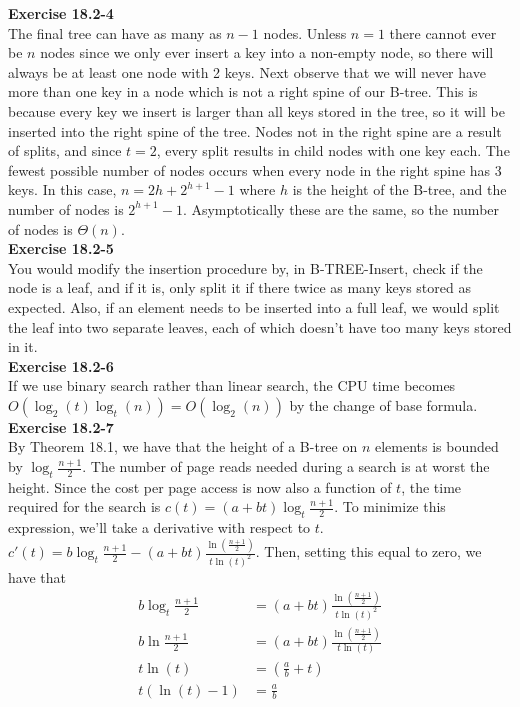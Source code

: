 \documentclass{article}
\begin{document}
\noindent\textbf{Exercise 18.2-4}\\

The final tree can have as many as $n-1$ nodes. Unless $n=1$ there cannot ever be $n$ nodes since we only ever insert a key into a non-empty node, so there will always be at least one node with 2 keys.  Next observe that we will never have more than one key in a node which is not a right spine of our B-tree.  This is because every key we insert is larger than all keys stored in the tree, so it will be inserted into the right spine of the tree.  Nodes not in the right spine are a result of splits, and since $t=2$, every split results in child nodes with one key each. The fewest possible number of nodes occurs when every node in the right spine has 3 keys.  In this case, $n=2h + 2^{h+1}-1$ where $h$ is the height of the B-tree, and the number of nodes is $2^{h+1}-1$.  Asymptotically these are the same, so the number of nodes is $\Theta(n)$.\\

\noindent\textbf{Exercise 18.2-5}\\

You would modify the insertion procedure by, in B-TREE-Insert, check if the node is a leaf, and if it is, only split it if there twice as many keys stored as expected. Also, if an element needs to be inserted into a full leaf, we would split the leaf into two separate leaves, each of which doesn't have too many keys stored in it.\\

\noindent\textbf{Exercise 18.2-6}\\

If we use binary search rather than linear search, the CPU time becomes $O(\log_2(t)\log_t(n)) = O(\log_2(n))$ by the change of base formula.\\

\noindent\textbf{Exercise 18.2-7}\\

By Theorem 18.1, we have that the height  of a B-tree on $n$ elements is bounded by $\log_t \frac{n+1}{2}$. The number of page reads needed during a search is at worst the height. Since the cost per page access is now also a function of $t$, the time required for the search is $c(t) = (a+bt)\log_t \frac{n+1}{2}$. To minimize this expression, we'll take a derivative with respect to $t$. $c'(t) = b \log_t\frac{n+1}{2} - (a+bt) \frac{\ln\left(\frac{n+1}{2}\right)}{t \ln(t)^2}$. Then, setting this equal to zero, we have that 
\begin{align*}
b \log_t\frac{n+1}{2} &= (a+bt) \frac{\ln\left(\frac{n+1}{2}\right)}{t \ln(t)^2}\\
b \ln\frac{n+1}{2} &= (a+bt) \frac{\ln\left(\frac{n+1}{2}\right)}{t \ln(t)}\\
t\ln(t) &=(\frac{a}{b} +t)\\
t(\ln(t)-1) &= \frac{a}{b}\\
\end{align*}
\end{document}
